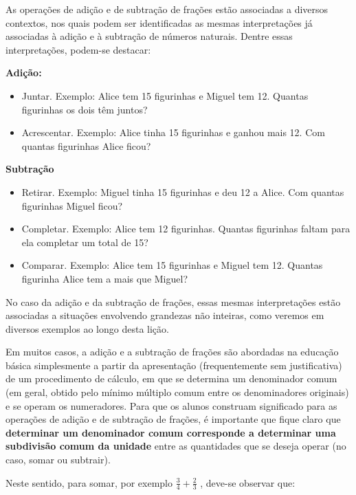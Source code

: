 
\noindent {\color{special}{\Large \bf LIÇÃO 5 - Para o professor}}
\vspace{.5cm}

  As operações de adição e de subtração de frações estão associadas a diversos contextos, nos quais podem ser identificadas as mesmas interpretações já associadas à adição e à subtração de números naturais.   
  Dentre essas interpretações, podem-se destacar:  
  
{\bf Adição:}  
\begin{itemize} %
    \item       Juntar. Exemplo: Alice tem 15 figurinhas e Miguel tem 12. Quantas figurinhas os dois têm juntos?
    \item       Acrescentar. Exemplo: Alice tinha 15 figurinhas e ganhou mais 12. Com quantas figurinhas Alice ficou?
\end{itemize} %
  
  
{\bf Subtração}  
\begin{itemize} %
    \item       Retirar. Exemplo: Miguel tinha 15 figurinhas e deu 12 a Alice. Com quantas figurinhas Miguel ficou?
    \item       Completar. Exemplo: Alice tem 12 figurinhas. Quantas figurinhas faltam para ela completar um total de 15?
    \item       Comparar. Exemplo: Alice tem 15 figurinhas e Miguel tem 12. Quantas figurinha Alice tem a mais que Miguel?
\end{itemize} %
  
  
  No caso da adição e da subtração de frações, essas mesmas interpretações estão associadas a situações envolvendo grandezas não inteiras, como veremos em diversos exemplos ao longo desta lição.  
  
  Em muitos casos, a adição e a subtração de frações são abordadas na educação básica simplesmente a partir da apresentação (frequentemente sem justificativa) de um procedimento de cálculo, em que se determina um denominador comum (em geral, obtido pelo mínimo múltiplo comum entre os denominadores originais) e se operam os numeradores. Para que os alunos construam significado para as operações de adição e de subtração de frações, é importante que fique claro que   {\bf determinar um denominador comum corresponde a determinar uma subdivisão comum da unidade}   entre as quantidades que se deseja operar (no caso, somar ou subtrair).  
  
  Neste sentido, para somar, por exemplo   $\frac{3}{4} + \frac{2}{3}$  , deve-se observar que:  
  
